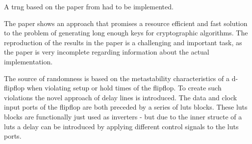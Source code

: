 A \gls{trng} based on the paper from \autocite{Majzoobi2011} had to be implemented.

The paper shows an approach that promises a resource efficient and fast solution to the
problem of generating long enough keys for cryptographic algorithms. The reproduction of
the results in the paper is a challenging and important task, as the paper is very
incomplete regarding information about the actual implementation.

The source of randomness is based on the metastability characteristics of a d-flipflop when violating setup or hold times of the flipflop.
To create such violations the novel approach of delay lines is introduced. The data and
clock input ports of the flipflop are both preceded by a series of \glspl{lut} blocks. 
These \glspl{lut} blocks are functionally just used as inverters - but due to the
inner structe of a \glspl{lut} a delay can be introduced by applying different control
signals to the \glspl{lut} ports.
